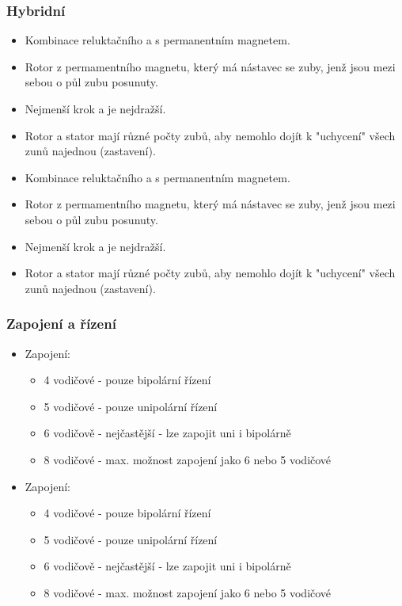 \subsubsection*{Hybridní}
\begin{itemize}
  \item Kombinace reluktačního a s permanentním magnetem. 
  \item Rotor z permamentního magnetu, který má nástavec se zuby, jenž jsou mezi sebou o půl zubu posunuty.
  \item Nejmenší krok a je nejdražší.
  \item Rotor a stator mají různé počty zubů, aby nemohlo dojít k "uchycení" všech zunů najednou (zastavení).
    \item Kombinace reluktačního a s permanentním magnetem.
    \item Rotor z permamentního magnetu, který má nástavec se zuby, jenž jsou mezi sebou o půl zubu posunuty.
    \item Nejmenší krok a je nejdražší.
    \item Rotor a stator mají různé počty zubů, aby nemohlo dojít k "uchycení" všech zunů najednou (zastavení).
\end{itemize}

\subsubsection*{Zapojení a řízení}
\begin{itemize}
  \item Zapojení: \begin{itemize}
    \item 4 vodičové - pouze bipolární řízení
    \item 5 vodičové - pouze unipolární řízení
    \item 6 vodičově - nejčastější - lze zapojit uni i bipolárně
    \item 8 vodičové - max. možnost zapojení jako 6 nebo 5 vodičové
  \end{itemize}
    \item Zapojení: \begin{itemize}
              \item 4 vodičové - pouze bipolární řízení
              \item 5 vodičové - pouze unipolární řízení
              \item 6 vodičově - nejčastější - lze zapojit uni i bipolárně
              \item 8 vodičové - max. možnost zapojení jako 6 nebo 5 vodičové
          \end{itemize}
\end{itemize}

